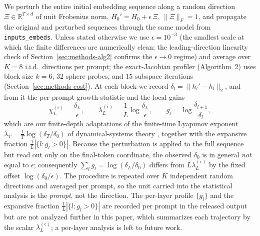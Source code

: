 \documentclass{article}
\begin{document}
We perturb the entire initial embedding sequence along a random direction
$\Xi\in\mathbb{R}^{T\times d}$ of unit Frobenius norm,
$H_0'=H_0+\epsilon\,\Xi$, $\|\Xi\|_F=1$, and propagate the original and perturbed sequences
through the same model from \texttt{inputs\_embeds}. Unless stated otherwise we use
$\epsilon=10^{-3}$ (the smallest scale at which the finite differences are numerically clean; the
leading-direction linearity check of Section~\ref{sec:methods-alg2} confirms the $\epsilon\to0$
regime) and average over $K=8$ i.i.d.\ directions per prompt; the exact-Jacobian profiler
(Algorithm~2) uses block size $k=6$, $32$ sphere probes, and $15$ subspace iterations
(Section~\ref{sec:methods-cost}). At each block we record
$\delta_l=\|h_l'-h_l\|_2$, and from it the per-prompt growth statistic and the local gains
\[
  \chi_L^{(\epsilon)}=\frac{\delta_L}{\epsilon},\qquad
  \lambda_L^{(\epsilon)}=\frac1L\log\frac{\delta_L}{\epsilon},\qquad
  g_l=\log\frac{\delta_{l+1}}{\delta_l},
\]
which are our finite-depth adaptations of the finite-time Lyapunov exponent
$\lambda_T=\tfrac1T\log(\delta_T/\delta_0)$ of dynamical-systems theory
\cite{oseledets1968multiplicative,shadden2005definition,haller2015lagrangian}, together with the
expansive fraction $\tfrac1L|\{l:g_l>0\}|$. Because the perturbation is
applied to the full sequence but read out only on the final-token coordinate, the observed
$\delta_0$ is in general \emph{not} equal to $\epsilon$; consequently
$\sum_l g_l=\log(\delta_L/\delta_0)$ differs from $L\lambda_L^{(\epsilon)}$ by the fixed offset
$\log(\delta_0/\epsilon)$. The procedure is repeated over $K$ independent random directions and
averaged per prompt, so the unit carried into the statistical analysis is the \emph{prompt}, not
the direction. The per-layer profile $\{g_l\}$ and the expansive fraction $\tfrac1L|\{l:g_l>0\}|$ are
recorded per prompt in the released output but are not analyzed further in this paper, which
summarizes each trajectory by the scalar $\lambda_L^{(\epsilon)}$; a per-layer analysis is left to
future work.
\end{document}
